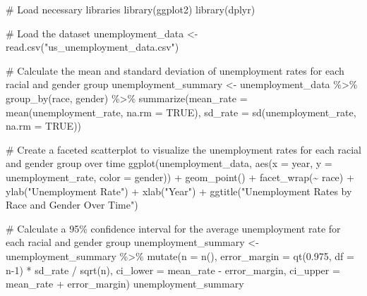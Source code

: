 \documentclass[
  letterpaper,
  DIV=11,
  numbers=noendperiod]{scrreprt}
\newenvironment{Shaded}{\begin{snugshade}}{\end{snugshade}}
\newcommand{\AttributeTok}[1]{\textcolor[rgb]{0.40,0.45,0.13}{#1}}
\newcommand{\CommentTok}[1]{\textcolor[rgb]{0.37,0.37,0.37}{#1}}
\newcommand{\ConstantTok}[1]{\textcolor[rgb]{0.56,0.35,0.01}{#1}}
\newcommand{\DecValTok}[1]{\textcolor[rgb]{0.68,0.00,0.00}{#1}}
\newcommand{\FloatTok}[1]{\textcolor[rgb]{0.68,0.00,0.00}{#1}}
\newcommand{\FunctionTok}[1]{\textcolor[rgb]{0.28,0.35,0.67}{#1}}
\newcommand{\NormalTok}[1]{\textcolor[rgb]{0.00,0.23,0.31}{#1}}
\newcommand{\OtherTok}[1]{\textcolor[rgb]{0.00,0.23,0.31}{#1}}
\newcommand{\SpecialCharTok}[1]{\textcolor[rgb]{0.37,0.37,0.37}{#1}}
\newcommand{\StringTok}[1]{\textcolor[rgb]{0.13,0.47,0.30}{#1}}
\begin{document}
\begin{Shaded}
\begin{Highlighting}[]
\CommentTok{\# Load necessary libraries}
\FunctionTok{library}\NormalTok{(ggplot2)}
\FunctionTok{library}\NormalTok{(dplyr)}

\CommentTok{\# Load the dataset}
\NormalTok{unemployment\_data }\OtherTok{\textless{}{-}} \FunctionTok{read.csv}\NormalTok{(}\StringTok{"us\_unemployment\_data.csv"}\NormalTok{)}

\CommentTok{\# Calculate the mean and standard deviation of unemployment rates for each racial and gender group}
\NormalTok{unemployment\_summary }\OtherTok{\textless{}{-}}\NormalTok{ unemployment\_data }\SpecialCharTok{\%\textgreater{}\%}
  \FunctionTok{group\_by}\NormalTok{(race, gender) }\SpecialCharTok{\%\textgreater{}\%}
  \FunctionTok{summarize}\NormalTok{(}\AttributeTok{mean\_rate =} \FunctionTok{mean}\NormalTok{(unemployment\_rate, }\AttributeTok{na.rm =} \ConstantTok{TRUE}\NormalTok{),}
            \AttributeTok{sd\_rate =} \FunctionTok{sd}\NormalTok{(unemployment\_rate, }\AttributeTok{na.rm =} \ConstantTok{TRUE}\NormalTok{))}

\CommentTok{\# Create a faceted scatterplot to visualize the unemployment rates for each racial and gender group over time}
\FunctionTok{ggplot}\NormalTok{(unemployment\_data, }\FunctionTok{aes}\NormalTok{(}\AttributeTok{x =}\NormalTok{ year, }\AttributeTok{y =}\NormalTok{ unemployment\_rate, }\AttributeTok{color =}\NormalTok{ gender)) }\SpecialCharTok{+}
  \FunctionTok{geom\_point}\NormalTok{() }\SpecialCharTok{+}
  \FunctionTok{facet\_wrap}\NormalTok{(}\SpecialCharTok{\textasciitilde{}}\NormalTok{ race) }\SpecialCharTok{+}
  \FunctionTok{ylab}\NormalTok{(}\StringTok{"Unemployment Rate"}\NormalTok{) }\SpecialCharTok{+} \FunctionTok{xlab}\NormalTok{(}\StringTok{"Year"}\NormalTok{) }\SpecialCharTok{+} 
  \FunctionTok{ggtitle}\NormalTok{(}\StringTok{"Unemployment Rates by Race and Gender Over Time"}\NormalTok{)}

\CommentTok{\# Calculate a 95\% confidence interval for the average unemployment rate for each racial and gender group}
\NormalTok{unemployment\_summary }\OtherTok{\textless{}{-}}\NormalTok{ unemployment\_summary }\SpecialCharTok{\%\textgreater{}\%}
  \FunctionTok{mutate}\NormalTok{(}\AttributeTok{n =} \FunctionTok{n}\NormalTok{(),}
         \AttributeTok{error\_margin =} \FunctionTok{qt}\NormalTok{(}\FloatTok{0.975}\NormalTok{, }\AttributeTok{df =}\NormalTok{ n}\DecValTok{{-}1}\NormalTok{) }\SpecialCharTok{*}\NormalTok{ sd\_rate }\SpecialCharTok{/} \FunctionTok{sqrt}\NormalTok{(n),}
         \AttributeTok{ci\_lower =}\NormalTok{ mean\_rate }\SpecialCharTok{{-}}\NormalTok{ error\_margin,}
         \AttributeTok{ci\_upper =}\NormalTok{ mean\_rate }\SpecialCharTok{+}\NormalTok{ error\_margin)}
\NormalTok{unemployment\_summary}
\end{Highlighting}
\end{Shaded}
\end{document}

